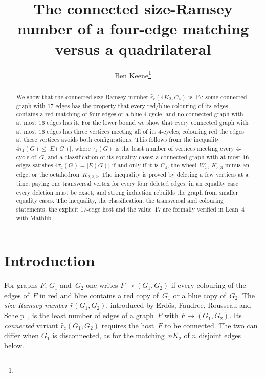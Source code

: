 \documentclass[11pt,letterpaper]{article}
\date{}
\title{The connected size-Ramsey number of a four-edge matching versus a quadrilateral}
\author{Ben Keene\thanks{\red{[affiliation]}}}
\numberwithin{equation}{section}
\theoremstyle{plain}
\theoremstyle{definition}
\theoremstyle{remark}
\newcommand{\rc}{\hat r_{\mathrm{c}}}
\begin{document}
\maketitle
\thispagestyle{plain}

\begin{abstract}
We show that the connected size-Ramsey number $\rc(4K_2,C_4)$ is~$17$: some connected graph with $17$ edges has the property that every red/blue colouring of its edges contains a red matching of four edges or a blue $4$-cycle, and no connected graph with at most $16$ edges has it. For the lower bound we show that every connected graph with at most $16$ edges has three vertices meeting all of its $4$-cycles; colouring red the edges at these vertices avoids both configurations. This follows from the inequality $4\tau_4(G)\le|E(G)|$, where $\tau_4(G)$ is the least number of vertices meeting every $4$-cycle of~$G$, and a classification of its equality cases: a connected graph with at most $16$ edges satisfies $4\tau_4(G)=|E(G)|$ if and only if it is $C_4$, the wheel~$W_5$, $K_{3,3}$ minus an edge, or the octahedron~$K_{2,2,2}$. The inequality is proved by deleting a few vertices at a time, paying one transversal vertex for every four deleted edges; in an equality case every deletion must be exact, and strong induction rebuilds the graph from smaller equality cases. The inequality, the classification, the transversal and colouring statements, the explicit $17$-edge host and the value~$17$ are formally verified in Lean~4 with Mathlib.
\end{abstract}

\section{Introduction}\label{sec:intro}

For graphs $F$, $G_1$ and~$G_2$ one writes $F\to(G_1,G_2)$ if every colouring of the edges of~$F$ in red and blue contains a red copy of~$G_1$ or a blue copy of~$G_2$. The \emph{size-Ramsey number} $\hat r(G_1,G_2)$, introduced by Erd\H{o}s, Faudree, Rousseau and Schelp~\cite{EFRS78}, is the least number of edges of a graph~$F$ with $F\to(G_1,G_2)$. Its \emph{connected} variant $\rc(G_1,G_2)$ requires the host~$F$ to be connected. The two can differ when $G_1$ is disconnected, as for the matching~$nK_2$ of $n$ disjoint edges below.
\end{document}
